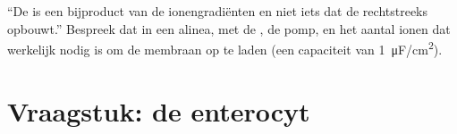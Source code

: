 \begin{exercise}[$\star\star\star$]\label{exo:b1:membranes-transport:12}
``De  is een bijproduct van de ionengradiënten en niet iets dat
de  rechtstreeks opbouwt.'' Bespreek dat in een alinea, met de
, de pomp, en het aantal ionen dat werkelijk nodig is om de
membraan op te laden (een capaciteit van \qty{1}{\micro F/cm^2}).
\end{exercise}

\section{Vraagstuk: de enterocyt}

